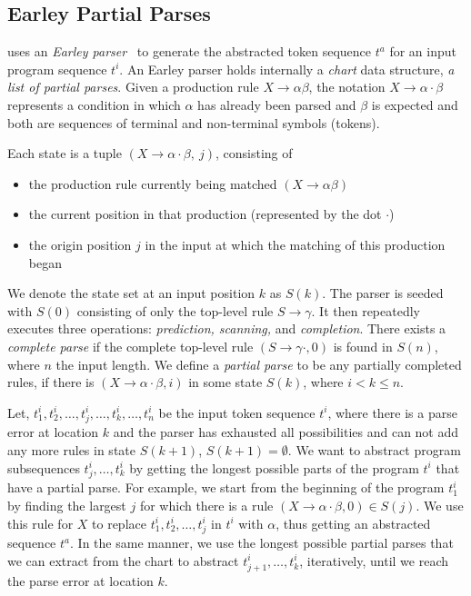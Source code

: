 \subsection{Earley Partial Parses}
\label{sec:prog-abstract:partial}

\toolname uses an \emph{Earley parser}~\citep{Earley_1970} to generate the
abstracted token sequence $t^a$ for an input program sequence $t^i$. An Earley
parser holds internally a \emph{chart} data structure, \ie \emph{a list of
partial parses}. Given a production rule $X \rightarrow \alpha \beta$, the
notation $X \rightarrow \alpha \cdot \beta$ represents a condition in which
$\alpha$ has already been parsed and $\beta$ is expected and both are sequences
of terminal and non-terminal symbols (tokens).

Each state is a tuple $(X \rightarrow \alpha \cdot \beta,\ j)$, consisting of
\begin{itemize}
    \item the production rule currently being matched $(X \rightarrow \alpha
    \beta)$
    \item the current position in that production (represented by the dot
    $\cdot$)
    \item the origin position $j$ in the input at which the matching of this
    production began
\end{itemize}

We denote the state set at an input position $k$ as $S(k)$. The parser is seeded
with $S(0)$ consisting of only the top-level rule $S \rightarrow \gamma$. It
then repeatedly executes three operations: \emph{prediction, scanning,} and
\emph{completion}. There exists a \emph{complete parse} if the complete
top-level rule $(S \rightarrow \gamma \cdot, 0)$ is found in $S(n)$, where $n$
the input length. We define a \emph{partial parse} to be any partially completed
rules, \ie if there is $(X \rightarrow \alpha \cdot \beta, i)$ in some state
$S(k)$, where $i < k \leq n$.

Let, $t^i_1, t^i_2, \dots, t^i_j, \dots, t^i_k, \dots, t^i_n$ be the
input token sequence $t^i$, where there is a parse error at location $k$ and the
parser has exhausted all possibilities and can not add any more rules in state
$S(k + 1)$, \ie $S(k + 1) = \emptyset$. We want to abstract program subsequences
$t^i_j, \dots, t^i_k$ by getting the longest possible parts of the program $t^i$
that have a partial parse. For example, we start from the beginning of the
program $t^i_1$ by finding the largest $j$ for which there is a rule $(X
\rightarrow \alpha \cdot \beta, 0) \in S(j)$. We use this rule for $X$ to
replace $t^i_1, t^i_2, \dots, t^i_j$ in $t^i$ with $\alpha$, thus getting an
abstracted sequence $t^a$. In the same manner, we use the longest possible
partial parses that we can extract from the chart to abstract $t^i_{j+1}, \dots,
t^i_k$, iteratively, until we reach the parse error at location $k$.

